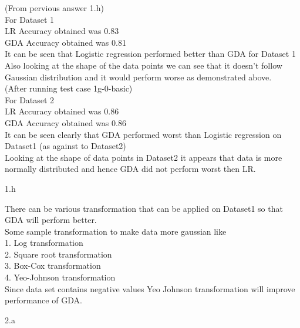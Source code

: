 \begin{answer}
  (From pervious answer 1.h) \\
  For Dataset 1 \\
  LR Accuracy obtained was 0.83 \\
  GDA Accuracy obtained was 0.81 \\
  It can be seen that Logistic regression performed better than GDA for Dataset 1 \\ 
  Also looking at the shape of the data points we can see that it doesn’t follow Gaussian distribution and it would perform worse as demonstrated above. \\

(After running test case 1g-0-basic) \\
For Dataset 2 \\
  LR Accuracy obtained was 0.86 \\
  GDA Accuracy obtained was 0.86 \\
  It can be seen clearly that GDA performed worst than Logistic regression on Dataset1 (as against to Dataset2)\\
  Looking at the shape of data points in Dataset2 it appears that data is more normally distributed and hence GDA did not perform worst then LR.
  
\end{answer}
\clearpage

\LARGE
1.h
\normalsize

\begin{answer}
  There can be various transformation that can be applied on Dataset1 so that GDA will perform better. \\
  Some sample transformation to make data more gaussian like \\
  1. Log transformation \\
  2. Square root transformation\\
  3. Box-Cox transformation \\
  4. Yeo-Johnson transformation \\
  Since data set contains negative values Yeo Johnson transformation will improve performance of GDA.
\end{answer}
\clearpage

\LARGE
2.a
\normalsize

